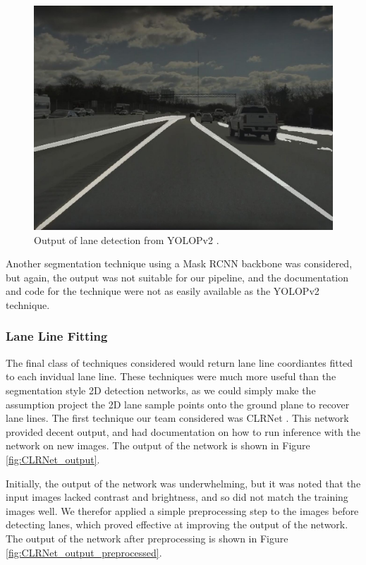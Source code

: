 \begin{figure}
    \centering
    \includegraphics[width=0.9\linewidth]{images/YOLOPv2.jpg}
    \caption{Output of lane detection from YOLOPv2 \cite{YOLOPv2}.}
    \label{fig:YOLOPv2_output}
\end{figure}

Another segmentation technique using a Mask RCNN backbone was considered, but again, the output was not suitable for our pipeline, and the documentation and code for the technique were not as easily available as the YOLOPv2 technique. 


\subsubsection{Lane Line Fitting}
The final class of techniques considered would return lane line coordiantes fitted to each invidual lane line. These techniques were much more useful than the segmentation style 2D detection networks, as we could simply make the assumption project the 2D lane sample points onto the ground plane to recover lane lines. The first technique our team considered was CLRNet \cite{CLRNet}. This network provided decent output, and had documentation on how to run inference with the network on new images. The output of the network is shown in Figure \ref{fig:CLRNet_output}.

Initially, the output of the network was underwhelming, but it was noted that the input images lacked contrast and brightness, and so did not match the training images well. We therefor applied a simple preprocessing step to the images before detecting lanes, which proved effective at improving the output of the network. The output of the network after preprocessing is shown in Figure \ref{fig:CLRNet_output_preprocessed}.

